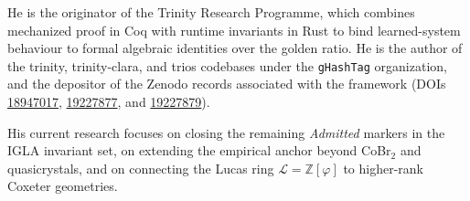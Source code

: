 He is the originator of the Trinity Research Programme, which combines
mechanized proof in Coq with runtime invariants in Rust to bind
learned-system behaviour to formal algebraic identities over the
golden ratio. He is the author of the \textsf{trinity},
\textsf{trinity-clara}, and \textsf{trios} codebases under the
\texttt{gHashTag} organization, and the depositor of the Zenodo
records associated with the framework
(DOIs \href{https://doi.org/10.5281/zenodo.18947017}{18947017},
\href{https://doi.org/10.5281/zenodo.19227877}{19227877}, and
\href{https://doi.org/10.5281/zenodo.19227879}{19227879}).

His current research focuses on closing the remaining \emph{Admitted}
markers in the IGLA invariant set, on extending the empirical anchor
beyond CoBr\(_{2}\) and quasicrystals, and on connecting the Lucas
ring \(\mathcal{L} = \mathbb{Z}[\varphi]\) to higher-rank Coxeter
geometries.
